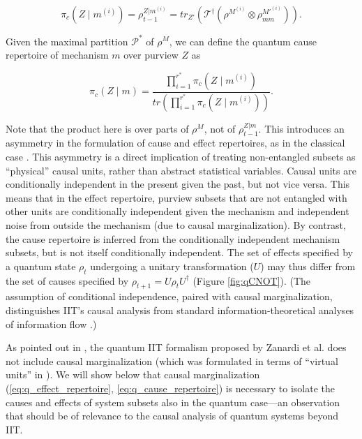 \documentclass[preprints, article, accept, pdftex, moreauthors, letterpaper]{Definitions/mdpi}
\renewcommand{\=}[1]{\stackrel{#1}{=}} %
\newcommand{\T}{\mathcal{T}} %
\newcommand{\rmm}{\rho_{mm}}
\renewcommand{\*}{\otimes}%
\begin{document}
\begin{equation}
\label{eq:q_single_cause_repertoire}
    \pi_c(Z \mid m^{(i)}) = \rho^{Z|m^{(i)}}_{t-1} = tr_{Z'}\left(\T^\dag(\rho^{M^{(i)}} \otimes \rmm^{M'^{(i)}})\right).
\end{equation}
%
\begin{Definition}
\label{def:q_cause_repertoire}
%
Given the maximal partition $\mathcal{P^*}$ of $\rho^{M}$, we can define the quantum cause repertoire of mechanism $m$ over purview $Z$ as

\begin{equation}
\label{eq:q_cause_repertoire}
\pi_c(Z \mid m) = \frac{\prod_{i=1}^{r^*} \pi_c(Z \mid m^{(i)})}{tr\left(\prod_{i=1}^{r^*} \pi_c(Z \mid m^{(i)}) \right)}.
\end{equation}
\end{Definition}
%
Note that the product here is over parts of $\rho^M$, not of $\rho^{Z|m}_{t-1}$. This introduces an asymmetry in the formulation of cause and effect repertoires, as in the classical case \cite{Oizumi2014, Albantakis2019}. This asymmetry is a direct implication of treating non-entangled subsets as ``physical'' causal units, rather than abstract statistical variables. Causal units are conditionally independent in the present given the past, but not vice versa. This means that in the effect repertoire, purview subsets that are not entangled with other units are conditionally independent given the mechanism and independent noise from outside the mechanism (due to causal marginalization). By contrast, the cause repertoire is inferred from the conditionally independent mechanism subsets, but is not itself conditionally independent. The set of effects specified by a quantum state $\rho_t$ undergoing a unitary transformation ($U$) may thus differ from the set of causes specified by $\rho_{t+1} = U \rho_t U^\dag$ (Figure \ref{fig:qCNOT}). (The assumption of conditional independence, paired with causal marginalization, distinguishes IIT's causal analysis from standard information-theoretical analyses of information flow \cite{Ay2008, Albantakis2019}.)

As pointed out in \cite{Kleiner2021}, the quantum IIT formalism proposed by Zanardi et al. \cite{Zanardi2018} does not include causal marginalization (which was formulated in terms of ``virtual units'' in \cite{Oizumi2014}). We will show below that causal marginalization (\ref{eq:q_effect_repertoire}, \ref{eq:q_cause_repertoire}) is necessary to isolate the causes and effects of system subsets also in the quantum case---an observation that should be of relevance to the causal analysis of quantum systems beyond IIT.
\end{document}
